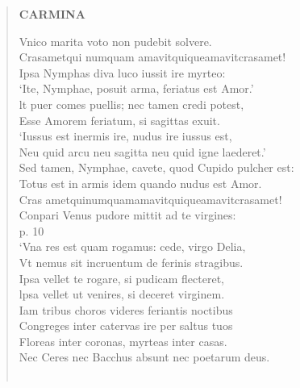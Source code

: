 \documentclass[11pt, a4paper]{report}
\begin{document}
\begin{verse}
     \marginpar{[172]} \begin{center} \textbf{CARMINA} \end{center}Vnico marita voto non pudebit solvere. \\ Crasametqui numquam amavitquiqueamavitcrasamet! \\ Ipsa Nymphas diva luco iussit ire myrteo: \\ ‘Ite, Nymphae, posuit arma, feriatus est Amor.’ \\ lt puer comes puellis; nec tamen credi potest, \\ Esse Amorem feriatum, si sagittas exuit. \\ ‘Iussus est inermis ire, nudus ire iussus est, \\ Neu quid arcu neu sagitta neu quid igne laederet.’ \\ Sed tamen, Nymphae, cavete, quod Cupido pulcher est: \\ Totus est in armis idem quando nudus est Amor. \\ Cras ametquinumquamamavitquiqueamavitcrasamet! \\ Conpari Venus pudore mittit ad te virgines: \\ p. 10 \\ ‘Vna res est quam rogamus: cede, virgo Delia, \\ Vt nemus sit incruentum de ferinis stragibus. \\ Ipsa vellet te rogare, si pudicam flecteret, \\ lpsa vellet ut venires, si deceret virginem. \\ Iam tribus choros videres feriantis noctibus \\ Congreges inter catervas ire per saltus tuos \\ Floreas inter coronas, myrteas inter casas. \\ Nec Ceres nec Bacchus absunt nec poetarum deus. \\ 
        ﻿\pagebreak 

\end{verse}
\end{document}
